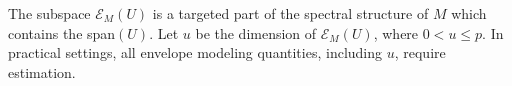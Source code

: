 \documentclass{article}\usepackage[]{graphicx}\usepackage[]{color}
\newcommand{\R}{\mathbb{R}}
\newcommand{\E}{\mathcal{E}}
\newcommand{\Ttil}{\widetilde{\theta}}
\newcommand{\rootn}{\sqrt{n}}
\begin{document}
The subspace $\E_M(U)$ is a targeted part of the spectral structure of $M$ which contains the span$(U)$. Let $u$ be the dimension of $\E_M(U)$, where $0 < u \leq p$. %
In practical settings, all envelope modeling quantities, including $u$, require estimation. 
\end{document}
